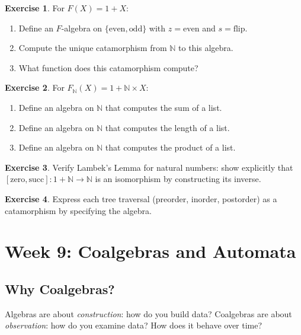 \documentclass[11pt]{article}
\newcommand{\N}{\mathbb{N}}
\theoremstyle{definition}
\newtheorem{exercise}{Exercise}[section]
\theoremstyle{plain}
\theoremstyle{remark}
\begin{document}
\begin{exercise}
For $F(X) = 1 + X$:
\begin{enumerate}[label=(\alph*)]
  \item Define an $F$-algebra on $\{\text{even}, \text{odd}\}$ with $z = \text{even}$ and $s = \text{flip}$.
  \item Compute the unique catamorphism from $\N$ to this algebra.
  \item What function does this catamorphism compute?
\end{enumerate}
\end{exercise}

\begin{exercise}
For $F_\N(X) = 1 + \N \times X$:
\begin{enumerate}[label=(\alph*)]
  \item Define an algebra on $\N$ that computes the sum of a list.
  \item Define an algebra on $\N$ that computes the length of a list.
  \item Define an algebra on $\N$ that computes the product of a list.
\end{enumerate}
\end{exercise}

\begin{exercise}
Verify Lambek's Lemma for natural numbers: show explicitly that $[\text{zero}, \text{succ}]: 1 + \N \to \N$ is an isomorphism by constructing its inverse.
\end{exercise}

\begin{exercise}
Express each tree traversal (preorder, inorder, postorder) as a catamorphism by specifying the algebra.
\end{exercise}

\section{Week 9: Coalgebras and Automata}

\subsection*{Why Coalgebras?}

Algebras are about \emph{construction}: how do you build data? Coalgebras are about \emph{observation}: how do you examine data? How does it behave over time?
\end{document}
